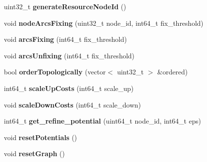 \begin{DoxyCompactItemize}
\item 
\hypertarget{classflowlessly_1_1Graph_ac27e3f9a0c8a2b6bac354f7b5a4595e8}{uint32\-\_\-t {\bfseries generate\-Resource\-Node\-Id} ()}\label{classflowlessly_1_1Graph_ac27e3f9a0c8a2b6bac354f7b5a4595e8}

\item 
\hypertarget{classflowlessly_1_1Graph_aa31d4c0e70c3d114bd29677cd8806653}{void {\bfseries node\-Arcs\-Fixing} (uint32\-\_\-t node\-\_\-id, int64\-\_\-t fix\-\_\-threshold)}\label{classflowlessly_1_1Graph_aa31d4c0e70c3d114bd29677cd8806653}

\item 
\hypertarget{classflowlessly_1_1Graph_a45f3b9a73e7a291cc5c930dad28dbfd1}{void {\bfseries arcs\-Fixing} (int64\-\_\-t fix\-\_\-threshold)}\label{classflowlessly_1_1Graph_a45f3b9a73e7a291cc5c930dad28dbfd1}

\item 
\hypertarget{classflowlessly_1_1Graph_ab0668cf590fb66e153da80a9cff0f8a0}{void {\bfseries arcs\-Unfixing} (int64\-\_\-t fix\-\_\-threshold)}\label{classflowlessly_1_1Graph_ab0668cf590fb66e153da80a9cff0f8a0}

\item 
\hypertarget{classflowlessly_1_1Graph_af5e993b70dcdbdfc180bb8dfaef0cc6b}{bool {\bfseries order\-Topologically} (vector$<$ uint32\-\_\-t $>$ \&ordered)}\label{classflowlessly_1_1Graph_af5e993b70dcdbdfc180bb8dfaef0cc6b}

\item 
\hypertarget{classflowlessly_1_1Graph_ab40c3233792f830f1eecef711cb6f570}{int64\-\_\-t {\bfseries scale\-Up\-Costs} (int64\-\_\-t scale\-\_\-up)}\label{classflowlessly_1_1Graph_ab40c3233792f830f1eecef711cb6f570}

\item 
\hypertarget{classflowlessly_1_1Graph_a7b03cb9ecbe2a962fba0304f4c379177}{void {\bfseries scale\-Down\-Costs} (int64\-\_\-t scale\-\_\-down)}\label{classflowlessly_1_1Graph_a7b03cb9ecbe2a962fba0304f4c379177}

\item 
\hypertarget{classflowlessly_1_1Graph_ab20a702a47cd79a6960662303aa0f8b8}{int64\-\_\-t {\bfseries get\-\_\-refine\-\_\-potential} (uint64\-\_\-t node\-\_\-id, int64\-\_\-t eps)}\label{classflowlessly_1_1Graph_ab20a702a47cd79a6960662303aa0f8b8}

\item 
\hypertarget{classflowlessly_1_1Graph_af32b31ea87c3641e67525c18733fc4a1}{void {\bfseries reset\-Potentials} ()}\label{classflowlessly_1_1Graph_af32b31ea87c3641e67525c18733fc4a1}

\item 
\hypertarget{classflowlessly_1_1Graph_af9798efb566421f6a2c0ce0eb4f89e23}{void {\bfseries reset\-Graph} ()}\label{classflowlessly_1_1Graph_af9798efb566421f6a2c0ce0eb4f89e23}

\end{DoxyCompactItemize}


